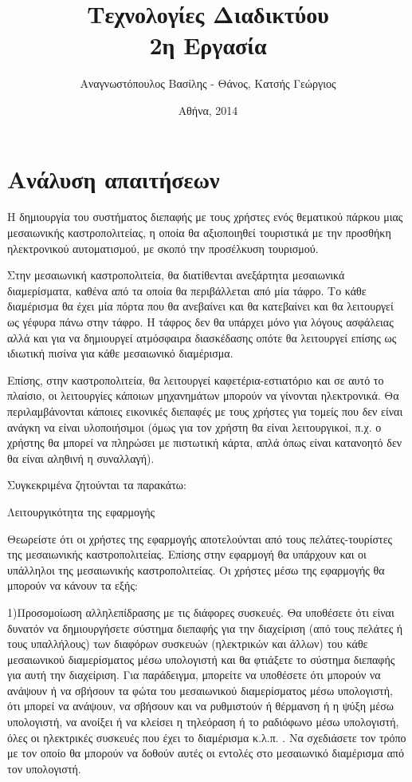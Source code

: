 \documentclass{assignment}
\title{Τεχνολογίες Διαδικτύου \\ 2η Εργασία}
\date{Αθήνα, 2014}
\author{Αναγνωστόπουλος Βασίλης - Θάνος, Κατσής Γεώργιος}
\begin{document}
\maketitle

\setcounter{page}{1} 

\pagestyle{plain}
\tableofcontents
\newpage


\pagestyle{fancy}
\setcounter{page}{1} 

\section{Ανάλυση απαιτήσεων}

Η δημιουργία του συστήματος διεπαφής με τους χρήστες ενός θεματικού πάρκου μιας μεσαιωνικής καστροπολιτείας, η οποία θα αξιοποιηθεί τουριστικά με την προσθήκη ηλεκτρονικού αυτοματισμού, με σκοπό την προσέλκυση τουρισμού.

Στην μεσαιωνική καστροπολιτεία, θα διατίθενται ανεξάρτητα μεσαιωνικά διαμερίσματα, καθένα από τα οποία θα περιβάλλεται από μία τάφρο. Το κάθε διαμέρισμα θα έχει μία πόρτα που θα ανεβαίνει και θα κατεβαίνει και θα λειτουργεί ως γέφυρα πάνω στην τάφρο. Η τάφρος δεν θα υπάρχει μόνο για λόγους ασφάλειας αλλά και για να δημιουργεί ατμόσφαιρα διασκέδασης οπότε θα λειτουργεί επίσης ως ιδιωτική πισίνα για κάθε μεσαιωνικό διαμέρισμα.

Επίσης, στην καστροπολιτεία, θα λειτουργεί καφετέρια-εστιατόριο και σε αυτό το πλαίσιο, οι λειτουργίες κάποιων μηχανημάτων μπορούν να γίνονται ηλεκτρονικά. Θα περιλαμβάνονται κάποιες εικονικές διεπαφές με τους χρήστες για τομείς που δεν είναι ανάγκη να είναι υλοποιήσιμοι (όμως για τον χρήστη θα είναι λειτουργικοί, π.χ. ο χρήστης θα μπορεί να πληρώσει με πιστωτική κάρτα, απλά όπως είναι κατανοητό δεν θα είναι αληθινή η συναλλαγή).  

Συγκεκριμένα ζητούνται τα παρακάτω:

Λειτουργικότητα της εφαρμογής

Θεωρείστε ότι οι χρήστες της εφαρμογής αποτελούνται από τους πελάτες-τουρίστες της μεσαιωνικής καστροπολιτείας. Επίσης στην εφαρμογή θα υπάρχουν και οι υπάλληλοι της μεσαιωνικής καστροπολιτείας. Οι χρήστες μέσω της εφαρμογής θα μπορούν να κάνουν τα εξής:

1)Προσομοίωση αλληλεπίδρασης με τις διάφορες συσκευές. Θα υποθέσετε ότι είναι δυνατόν να δημιουργήσετε σύστημα διεπαφής για την διαχείριση (από τους πελάτες ή τους υπαλλήλους) των διαφόρων συσκευών (ηλεκτρικών και άλλων) του κάθε μεσαιωνικού διαμερίσματος μέσω υπολογιστή και θα φτιάξετε το σύστημα διεπαφής για αυτή την διαχείριση. Για παράδειγμα, μπορείτε να υποθέσετε ότι μπορούν να ανάψουν ή να σβήσουν τα φώτα του μεσαιωνικού διαμερίσματος μέσω υπολογιστή, ότι μπορεί να ανάψουν, να σβήσουν και να ρυθμιστούν ή θέρμανση ή η ψύξη μέσω υπολογιστή, να ανοίξει ή να κλείσει η τηλεόραση ή το ραδιόφωνο μέσω υπολογιστή, όλες οι ηλεκτρικές συσκευές που έχει το διαμέρισμα κ.λ.π. . Να σχεδιάσετε τον τρόπο με τον οποίο θα μπορούν να δοθούν αυτές οι εντολές στο μεσαιωνικό διαμέρισμα από τον υπολογιστή.
\end{document}
